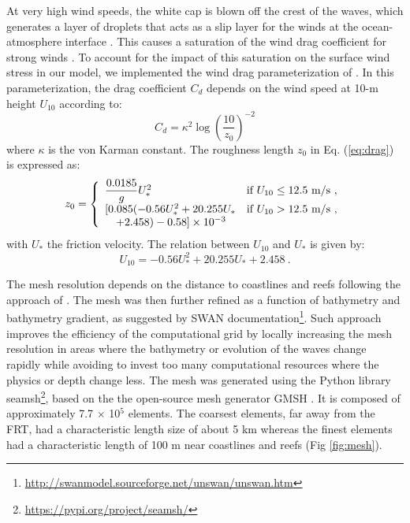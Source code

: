 \documentclass[11pt,a4paper]{article}
\begin{document}
At very high wind speeds, the white cap is blown off the crest of the waves, which generates a layer of droplets that acts as a slip layer for the winds at the ocean-atmosphere interface \citep{holthuijsen2012wind}. This causes a saturation of the wind drag coefficient for strong winds \citep{donelan2004limiting,powell2003reduced}. To account for the impact of this saturation on the surface wind stress in our model, we implemented the wind drag parameterization of \cite{moon2007physics}. In this parameterization, the drag coefficient $C_d$ depends on the wind speed at 10-m height $U_{10}$ according to:
\begin{equation}
    C_d = \kappa^2 \log\left(\dfrac{10}{z_0}\right)^{-2}\label{eq:drag}
\end{equation}
where $\kappa$ is the von Karman constant. The roughness length $z_0$ in Eq. (\ref{eq:drag}) is expressed as: 
\begin{equation}
    z_0 =\left\{\begin{array}[]{ll}
        \dfrac{0.0185}{g}U_{\ast}^2 & \text{if }U_{10} \leq 12.5\text{ m/s}~, \\
        \lbrack 0.085(-0.56U_{\ast}^2+20.255U_{\ast} & \text{if }U_{10} > 12.5\text{ m/s}~, \\
        \quad +2.458) - 0.58\rbrack\times 10^{-3} 
    \end{array}\right.
\end{equation}
with $U_\ast$ the friction velocity. The relation between $U_{10}$ and $U_{\ast}$ is given by:
\begin{equation}
    U_{10}=-0.56U_{\ast}^2+20.255U_{\ast}+2.458~.
\end{equation}

The mesh resolution depends on the distance to coastlines and reefs following the approach of \citep{dobbelaere2020coupled}. The mesh was then further refined as a function of bathymetry and bathymetry gradient, as suggested by SWAN documentation\footnote{\url{http://swanmodel.sourceforge.net/unswan/unswan.htm}}. Such approach improves the efficiency of the computational grid by locally increasing the mesh resolution in areas where the bathymetry or evolution of the waves change rapidly while avoiding to invest too many computational resources where the physics or depth change less. The mesh was generated using the Python library seamsh\footnote{\url{https://pypi.org/project/seamsh/}}, based on the the open-source mesh generator GMSH \citep{geuzaine2009gmsh}. It is composed of approximately 7.7 $\times$ 10$^5$ elements. The coarsest elements, far away from the FRT, had a characteristic length size of about 5 km whereas the finest elements had a characteristic length of 100 m near coastlines and reefs (Fig \ref{fig:mesh}).
\end{document}
